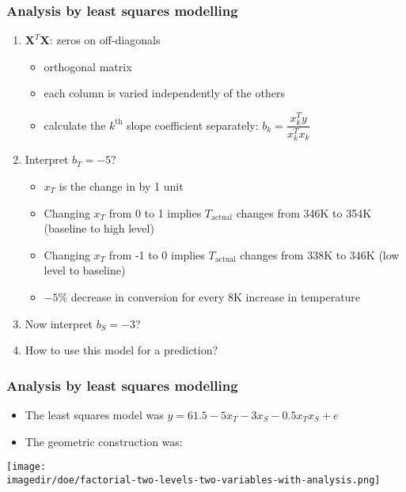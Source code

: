 \begin{frame}\frametitle{Analysis by least squares modelling}
	\vspace{6pt}
	\begin{enumerate}
		\item	$\mathbf{X}^T\mathbf{X}$: zeros on off-diagonals
		\begin{itemize}
			\item	orthogonal matrix
			\item	each column is varied independently of the others
			\item	calculate the $k^\text{th}$ slope coefficient separately: $b_k = \dfrac{x_k^Ty}{x_k^Tx_k}$
		\end{itemize}
		\item	Interpret $b_T = -5$?
		\begin{itemize}
			\item	$x_T$ is the change in {} by 1 unit
			\item	Changing $x_T$ from 0 to 1 implies $T_\text{actual}$ changes from 346K to 354K (baseline to high level)
			\item	Changing $x_T$ from -1 to 0 implies $T_\text{actual}$ changes from 338K to 346K (low level to baseline)
			\item	$-5$\% decrease in conversion for every 8K increase in temperature
		\end{itemize}
		\item	Now interpret $b_S = -3$?
		\item	How to use this model for a prediction?
	\end{enumerate}
\end{frame}

\begin{frame}\frametitle{Analysis by least squares modelling}
	\begin{itemize}
		\item	{\footnotesize The least squares model was} $y = 61.5 - 5 x_T - 3 x_S - 0.5 x_Tx_S + e$
		\item	The geometric construction was:
	\end{itemize}
	\begin{center}
		\texttt{[image: \\imagedir/doe/factorial-two-levels-two-variables-with-analysis.png]}
	\end{center}
	{}
\end{frame}

